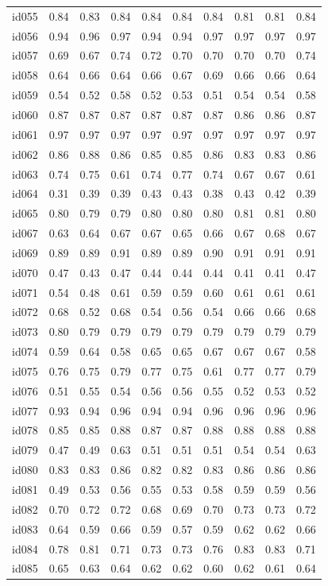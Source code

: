 \begin{tabular}{lrrrrrrrrr}
id055 & 0.84 & 0.83 & 0.84 & 0.84 & 0.84 & 0.84 & 0.81 & 0.81 & 0.84 \\
id056 & 0.94 & 0.96 & 0.97 & 0.94 & 0.94 & 0.97 & 0.97 & 0.97 & 0.97 \\
id057 & 0.69 & 0.67 & 0.74 & 0.72 & 0.70 & 0.70 & 0.70 & 0.70 & 0.74 \\
id058 & 0.64 & 0.66 & 0.64 & 0.66 & 0.67 & 0.69 & 0.66 & 0.66 & 0.64 \\
id059 & 0.54 & 0.52 & 0.58 & 0.52 & 0.53 & 0.51 & 0.54 & 0.54 & 0.58 \\
id060 & 0.87 & 0.87 & 0.87 & 0.87 & 0.87 & 0.87 & 0.86 & 0.86 & 0.87 \\
id061 & 0.97 & 0.97 & 0.97 & 0.97 & 0.97 & 0.97 & 0.97 & 0.97 & 0.97 \\
id062 & 0.86 & 0.88 & 0.86 & 0.85 & 0.85 & 0.86 & 0.83 & 0.83 & 0.86 \\
id063 & 0.74 & 0.75 & 0.61 & 0.74 & 0.77 & 0.74 & 0.67 & 0.67 & 0.61 \\
id064 & 0.31 & 0.39 & 0.39 & 0.43 & 0.43 & 0.38 & 0.43 & 0.42 & 0.39 \\
id065 & 0.80 & 0.79 & 0.79 & 0.80 & 0.80 & 0.80 & 0.81 & 0.81 & 0.80 \\
id067 & 0.63 & 0.64 & 0.67 & 0.67 & 0.65 & 0.66 & 0.67 & 0.68 & 0.67 \\
id069 & 0.89 & 0.89 & 0.91 & 0.89 & 0.89 & 0.90 & 0.91 & 0.91 & 0.91 \\
id070 & 0.47 & 0.43 & 0.47 & 0.44 & 0.44 & 0.44 & 0.41 & 0.41 & 0.47 \\
id071 & 0.54 & 0.48 & 0.61 & 0.59 & 0.59 & 0.60 & 0.61 & 0.61 & 0.61 \\
id072 & 0.68 & 0.52 & 0.68 & 0.54 & 0.56 & 0.54 & 0.66 & 0.66 & 0.68 \\
id073 & 0.80 & 0.79 & 0.79 & 0.79 & 0.79 & 0.79 & 0.79 & 0.79 & 0.79 \\
id074 & 0.59 & 0.64 & 0.58 & 0.65 & 0.65 & 0.67 & 0.67 & 0.67 & 0.58 \\
id075 & 0.76 & 0.75 & 0.79 & 0.77 & 0.75 & 0.61 & 0.77 & 0.77 & 0.79 \\
id076 & 0.51 & 0.55 & 0.54 & 0.56 & 0.56 & 0.55 & 0.52 & 0.53 & 0.52 \\
id077 & 0.93 & 0.94 & 0.96 & 0.94 & 0.94 & 0.96 & 0.96 & 0.96 & 0.96 \\
id078 & 0.85 & 0.85 & 0.88 & 0.87 & 0.87 & 0.88 & 0.88 & 0.88 & 0.88 \\
id079 & 0.47 & 0.49 & 0.63 & 0.51 & 0.51 & 0.51 & 0.54 & 0.54 & 0.63 \\
id080 & 0.83 & 0.83 & 0.86 & 0.82 & 0.82 & 0.83 & 0.86 & 0.86 & 0.86 \\
id081 & 0.49 & 0.53 & 0.56 & 0.55 & 0.53 & 0.58 & 0.59 & 0.59 & 0.56 \\
id082 & 0.70 & 0.72 & 0.72 & 0.68 & 0.69 & 0.70 & 0.73 & 0.73 & 0.72 \\
id083 & 0.64 & 0.59 & 0.66 & 0.59 & 0.57 & 0.59 & 0.62 & 0.62 & 0.66 \\
id084 & 0.78 & 0.81 & 0.71 & 0.73 & 0.73 & 0.76 & 0.83 & 0.83 & 0.71 \\
id085 & 0.65 & 0.63 & 0.64 & 0.62 & 0.62 & 0.60 & 0.62 & 0.61 & 0.64 \\
\bottomrule
\end{tabular}
